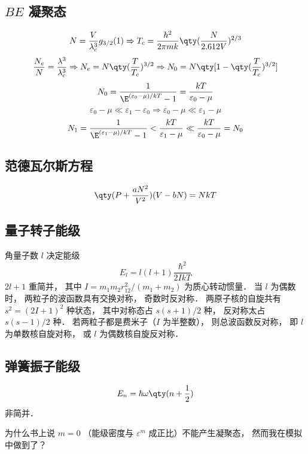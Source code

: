 \subsection{$BE$ 凝聚态}
\begin{equation}
N = \frac{V}{\lambda_c^3} g_{3/2} (1) \Rightarrow T_c = \frac{h^2}{2\pi mk} \qty(\frac{N}{2.612V})^{2/3}
\end{equation}
\begin{equation}
\frac{N_e}{N} = \frac{\lambda^3}{\lambda_c^3} \Rightarrow N_e = N\qty(\frac{T}{T_c})^{3/2} \Rightarrow {N_0} = N\qty[1 - \qty(\frac{T}{T_c})^{3/2}]
\end{equation}
\begin{equation}
N_0 = \frac{1}{\E^{(\varepsilon_0 - \mu )/kT} - 1} = \frac{kT}{\varepsilon_0 - \mu}
\end{equation}
\begin{equation}
\varepsilon_0 - \mu  \ll \varepsilon_1 - \varepsilon_0 \Rightarrow \varepsilon_0 - \mu  \ll \varepsilon_1 - \mu 
\end{equation}
\begin{equation}
N_1 = \frac{1}{\E^{(\varepsilon_1 - \mu )/kT} - 1} < \frac{kT}{\varepsilon_1 - \mu} \ll \frac{kT}{\varepsilon_0 - \mu } = N_0
\end{equation}
\subsection{范德瓦尔斯方程}
\begin{equation}
\qty(P + \frac{aN^2}{V^2}) (V - bN) = NkT
\end{equation}
\subsection{量子转子能级}
角量子数 $l$ 决定能级
\begin{equation}
E_l = l (l + 1)\frac{\hbar^2}{2IkT}
\end{equation}
$2l+1$ 重简并， 其中 $I = m_1 m_2 r_{12}^2/(m_1 + m_2)$ 为质心转动惯量． 当 $l$ 为偶数时， 两粒子的波函数具有交换对称， 奇数时反对称． 两原子核的自旋共有 $s^2 = (2I + 1)^2$ 种状态， 其中对称态占 $s(s + 1)/2$ 种， 反对称太占 $s(s - 1)/2$ 种． 若两粒子都是费米子（$I$ 为半整数）， 则总波函数反对称， 即 $l$ 为单数核自旋对称， 或 $l$ 为偶数核自旋反对称．

\subsection{弹簧振子能级}
\begin{equation}
E_n = \hbar \omega \qty(n + \frac12)
\end{equation}
非简并．

为什么书上说 $m = 0 $ （能级密度与 $\varepsilon^m$ 成正比）不能产生凝聚态， 然而我在模拟中做到了？